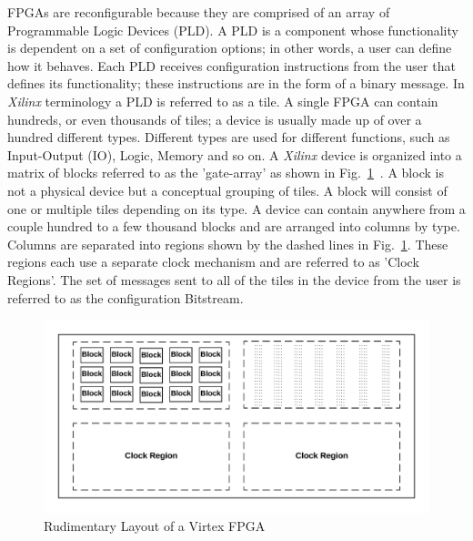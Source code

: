 \documentclass[journal, hidelinks]{IEEEtran}
\begin{document}
FPGAs are reconfigurable because they are comprised of an array of Programmable Logic Devices (PLD).
A PLD is a component whose functionality is dependent on a set of configuration options; in other words, a user can define how it behaves.
Each PLD receives configuration instructions from the user that defines its functionality; these instructions are in the form of a binary message.
In \textit{Xilinx} terminology a PLD is referred to as a tile. 
A single FPGA can contain hundreds, or even thousands of tiles; a device is usually made up of over a hundred different types.
Different types are used for different functions, such as Input-Output (IO), Logic, Memory and so on.
A \textit{Xilinx} device is organized into a matrix of blocks referred to as the 'gate-array' as shown in Fig.~\ref{fig:FPGA}~\cite{xilnxDevManual}.
A block is not a physical device but a conceptual grouping of tiles.
A block will consist of one or multiple tiles depending on its type.
A device can contain anywhere from a couple hundred to a few thousand blocks and are arranged into columns by type.
Columns are separated into regions shown by the dashed lines in Fig.~\ref{fig:FPGA}.
These regions each use a separate clock mechanism and are referred to as 'Clock Regions'.
The set of messages sent to all of the tiles in the device from the user is referred to as the configuration Bitstream.

\begin{figure}[h]
	\centering
	\includegraphics[width=1\linewidth]{Figures/FPGA}
	\caption[Rudimentary Layout of a Virtex FPGA]{Rudimentary Layout of a Virtex FPGA}
	\label{fig:FPGA}
\end{figure}
\end{document}
